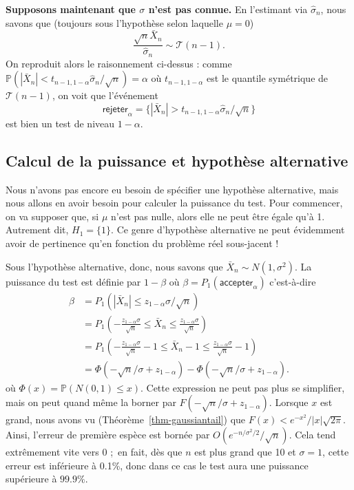 \documentclass[
  10,
  letterpaper,
  DIV=11,
  numbers=noendperiod]{scrreport}
\theoremstyle{plain}
\theoremstyle{definition}
\theoremstyle{plain}
\theoremstyle{definition}
\theoremstyle{definition}
\theoremstyle{plain}
\theoremstyle{remark}
\begin{document}
\textbf{Supposons maintenant que \(\sigma\) n'est pas connue.} En
l'estimant via \(\hat{\sigma}_n\), nous savons que (toujours sous
l'hypothèse selon laquelle \(\mu=0\))
\[ \frac{\sqrt{n}\bar{X}_n}{\hat{\sigma}_n} \sim \mathscr{T}(n-1).\] On
reproduit alors le raisonnement ci-dessus : comme
\(\mathbb{P}(|\bar{X}_n| < t_{n-1, 1-\alpha}\hat{\sigma}_n / \sqrt{n}) = \alpha\)
où \(t_{n-1,1-\alpha}\) est le quantile symétrique de
\(\mathscr{T}(n-1)\), on voit que l'événement
\[ \mathsf{rejeter}_\alpha = \{|\bar{X}_n| > t_{n-1,1-\alpha}\hat{\sigma}_n / \sqrt{n}\}\]
est bien un test de niveau \(1-\alpha\).

\hypertarget{calcul-de-la-puissance-et-hypothuxe8se-alternative}{%
\subsection{Calcul de la puissance et hypothèse
alternative}\label{calcul-de-la-puissance-et-hypothuxe8se-alternative}}

Nous n'avons pas encore eu besoin de spécifier une hypothèse
alternative, mais nous allons en avoir besoin pour calculer la puissance
du test. Pour commencer, on va supposer que, si \(\mu\) n'est pas nulle,
alors elle ne peut être égale qu'à 1. Autrement dit, \(H_1 = \{1\}\). Ce
genre d'hypothèse alternative ne peut évidemment avoir de pertinence
qu'en fonction du problème réel sous-jacent !

Sous l'hypothèse alternative, donc, nous savons que
\(\bar{X}_n \sim N(1, \sigma^2)\). La puissance du test est définie par
\(1-\beta\) où \(\beta=P_1(\mathsf{accepter}_\alpha)\) c'est-à-dire
\begin{align}\beta &= P_1(|\bar{X}_n|\leqslant z_{1-\alpha} \sigma / \sqrt{n}) \\
&= P_1 \left(-\frac{z_{1-\alpha} \sigma}{\sqrt{n}}\leqslant \bar{X}_n \leqslant \frac{z_{1-\alpha} \sigma}{\sqrt{n}} \right) \\
&= P_1 \left(-\frac{z_{1-\alpha} \sigma}{\sqrt{n}}-1\leqslant \bar{X}_n - 1 \leqslant \frac{z_{1-\alpha} \sigma}{\sqrt{n}} -1 \right)\\
&= \Phi(-\sqrt{n}/\sigma + z_{1-\alpha}) - \Phi(-\sqrt{n}/\sigma + z_{1-\alpha}).
\end{align} où \(\Phi(x) = \mathbb{P}(N(0,1)\leqslant x)\). Cette
expression ne peut pas plus se simplifier, mais on peut quand même la
borner par \(F(-\sqrt{n}/\sigma + z_{1-\alpha})\). Lorsque \(x\) est
grand, nous avons vu (Théorème~\ref{thm-gaussiantail}) que
\(F(x) < e^{-x^2}/|x|\sqrt{2\pi}\). Ainsi, l'erreur de première espèce
est bornée par \(O(e^{-n/\sigma^2/2} / \sqrt{n})\). Cela tend
extrêmement vite vers 0 ;~en fait, dès que \(n\) est plus grand que 10
et \(\sigma=1\), cette erreur est inférieure à 0.1\%, donc dans ce cas
le test aura une puissance supérieure à \(99.9\%\).
\end{document}
